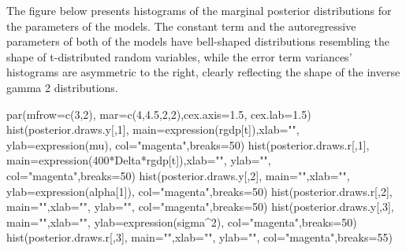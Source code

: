 \documentclass[
  letterpaper,
  DIV=11,
  numbers=noendperiod]{scrreprt}
\newenvironment{Shaded}{\begin{snugshade}}{\end{snugshade}}
\newcommand{\AttributeTok}[1]{\textcolor[rgb]{0.40,0.45,0.13}{#1}}
\newcommand{\DecValTok}[1]{\textcolor[rgb]{0.68,0.00,0.00}{#1}}
\newcommand{\FloatTok}[1]{\textcolor[rgb]{0.68,0.00,0.00}{#1}}
\newcommand{\FunctionTok}[1]{\textcolor[rgb]{0.28,0.35,0.67}{#1}}
\newcommand{\NormalTok}[1]{\textcolor[rgb]{0.00,0.23,0.31}{#1}}
\newcommand{\SpecialCharTok}[1]{\textcolor[rgb]{0.37,0.37,0.37}{#1}}
\newcommand{\StringTok}[1]{\textcolor[rgb]{0.13,0.47,0.30}{#1}}
\begin{document}
The figure below presents histograms of the marginal posterior
distributions for the parameters of the models. The constant term and
the autoregressive parameters of both of the models have bell-shaped
distributions resembling the shape of t-distributed random variables,
while the error term variances' histograms are asymmetric to the right,
clearly reflecting the shape of the inverse gamma 2 distributions.

\begin{Shaded}
\begin{Highlighting}[]
\FunctionTok{par}\NormalTok{(}\AttributeTok{mfrow=}\FunctionTok{c}\NormalTok{(}\DecValTok{3}\NormalTok{,}\DecValTok{2}\NormalTok{), }\AttributeTok{mar=}\FunctionTok{c}\NormalTok{(}\DecValTok{4}\NormalTok{,}\FloatTok{4.5}\NormalTok{,}\DecValTok{2}\NormalTok{,}\DecValTok{2}\NormalTok{),}\AttributeTok{cex.axis=}\FloatTok{1.5}\NormalTok{, }\AttributeTok{cex.lab=}\FloatTok{1.5}\NormalTok{)}
\FunctionTok{hist}\NormalTok{(posterior.draws.y[,}\DecValTok{1}\NormalTok{], }\AttributeTok{main=}\FunctionTok{expression}\NormalTok{(rgdp[t]),}\AttributeTok{xlab=}\StringTok{""}\NormalTok{, }\AttributeTok{ylab=}\FunctionTok{expression}\NormalTok{(mu), }\AttributeTok{col=}\StringTok{"magenta"}\NormalTok{,}\AttributeTok{breaks=}\DecValTok{50}\NormalTok{)}
\FunctionTok{hist}\NormalTok{(posterior.draws.r[,}\DecValTok{1}\NormalTok{], }\AttributeTok{main=}\FunctionTok{expression}\NormalTok{(}\DecValTok{400}\SpecialCharTok{*}\NormalTok{Delta}\SpecialCharTok{*}\NormalTok{rgdp[t]),}\AttributeTok{xlab=}\StringTok{""}\NormalTok{, }\AttributeTok{ylab=}\StringTok{""}\NormalTok{, }\AttributeTok{col=}\StringTok{"magenta"}\NormalTok{,}\AttributeTok{breaks=}\DecValTok{50}\NormalTok{)}
\FunctionTok{hist}\NormalTok{(posterior.draws.y[,}\DecValTok{2}\NormalTok{], }\AttributeTok{main=}\StringTok{""}\NormalTok{,}\AttributeTok{xlab=}\StringTok{""}\NormalTok{, }\AttributeTok{ylab=}\FunctionTok{expression}\NormalTok{(alpha[}\DecValTok{1}\NormalTok{]), }\AttributeTok{col=}\StringTok{"magenta"}\NormalTok{,}\AttributeTok{breaks=}\DecValTok{50}\NormalTok{)}
\FunctionTok{hist}\NormalTok{(posterior.draws.r[,}\DecValTok{2}\NormalTok{], }\AttributeTok{main=}\StringTok{""}\NormalTok{,}\AttributeTok{xlab=}\StringTok{""}\NormalTok{, }\AttributeTok{ylab=}\StringTok{""}\NormalTok{, }\AttributeTok{col=}\StringTok{"magenta"}\NormalTok{,}\AttributeTok{breaks=}\DecValTok{50}\NormalTok{)}
\FunctionTok{hist}\NormalTok{(posterior.draws.y[,}\DecValTok{3}\NormalTok{], }\AttributeTok{main=}\StringTok{""}\NormalTok{,}\AttributeTok{xlab=}\StringTok{""}\NormalTok{, }\AttributeTok{ylab=}\FunctionTok{expression}\NormalTok{(sigma}\SpecialCharTok{\^{}}\DecValTok{2}\NormalTok{), }\AttributeTok{col=}\StringTok{"magenta"}\NormalTok{,}\AttributeTok{breaks=}\DecValTok{50}\NormalTok{)}
\FunctionTok{hist}\NormalTok{(posterior.draws.r[,}\DecValTok{3}\NormalTok{], }\AttributeTok{main=}\StringTok{""}\NormalTok{,}\AttributeTok{xlab=}\StringTok{""}\NormalTok{, }\AttributeTok{ylab=}\StringTok{""}\NormalTok{, }\AttributeTok{col=}\StringTok{"magenta"}\NormalTok{,}\AttributeTok{breaks=}\DecValTok{55}\NormalTok{)}
\end{Highlighting}
\end{Shaded}
\end{document}
